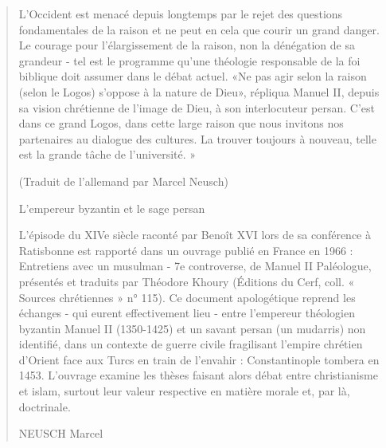 \begin{quote}
L'Occident est menacé depuis longtemps par le rejet des questions fondamentales de la raison et ne peut en cela que courir un grand danger. Le courage pour l'élargissement de la raison, non la dénégation de sa grandeur - tel est le programme qu'une théologie responsable de la foi biblique doit assumer dans le débat actuel. «Ne pas agir selon la raison (selon le Logos) s'oppose à la nature de Dieu», répliqua Manuel II, depuis sa vision chrétienne de l'image de Dieu, à son interlocuteur persan. C'est dans ce grand Logos, dans cette large raison que nous invitons nos partenaires au dialogue des cultures. La trouver toujours à nouveau, telle est la grande tâche de l'université. »

(Traduit de l'allemand par Marcel Neusch)

L'empereur byzantin et le sage persan

L'épisode du XIVe siècle raconté par Benoît XVI lors de sa conférence à Ratisbonne est rapporté dans un ouvrage publié en France en 1966 : Entretiens avec un musulman - 7e controverse, de Manuel II Paléologue, présentés et traduits par Théodore Khoury (Éditions du Cerf, coll. « Sources chrétiennes » n° 115). Ce document apologétique reprend les échanges - qui eurent effectivement lieu - entre l'empereur théologien byzantin Manuel II (1350-1425) et un savant persan (un mudarris) non identifié, dans un contexte de guerre civile fragilisant l'empire chrétien d'Orient face aux Turcs en train de l'envahir : Constantinople tombera en 1453. L'ouvrage examine les thèses faisant alors débat entre christianisme et islam, surtout leur valeur respective en matière morale et, par là, doctrinale.

NEUSCH Marcel
\end{quote}